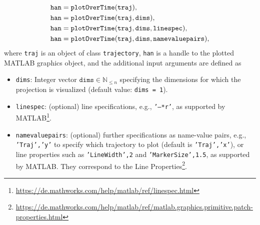 \begin{equation*}
	\begin{split}
		&\texttt{han} = {\normalfont \texttt{plotOverTime}}(\texttt{traj}), \\
		&\texttt{han} = {\normalfont \texttt{plotOverTime}}(\texttt{traj},\texttt{dims}), \\
		&\texttt{han} = {\normalfont \texttt{plotOverTime}}(\texttt{traj},\texttt{dims},\texttt{linespec}), \\
		&\texttt{han} = {\normalfont \texttt{plotOverTime}}(\texttt{traj},\texttt{dims},\texttt{namevaluepairs}),
	\end{split}
\end{equation*}
where \texttt{traj} is an object of class \texttt{trajectory}, \texttt{han} is a handle to the plotted MATLAB graphics object, and the additional input arguments are defined as

\begin{itemize}
	\item \texttt{dims}: Integer vector $\texttt{dims} \in \mathbb{N}_{\leq n}$ specifying the dimensions for which the projection is visualized (default value: \texttt{dims = 1}).
	\item \texttt{linespec}: (optional) line specifications, e.g., \texttt{'--*r'}, as supported by MATLAB\footnote{\url{https://de.mathworks.com/help/matlab/ref/linespec.html}}.
	\item \texttt{namevaluepairs}: (optional) further specifications as name-value pairs, e.g., \texttt{'Traj','y'} to specify which trajectory to plot (default is \texttt{'Traj','x'}), or line properties such as
	\texttt{'LineWidth',2} and \texttt{'MarkerSize',1.5}, as supported by MATLAB.
	They correspond to the Line Properties\footnote{\url{https://de.mathworks.com/help/matlab/ref/matlab.graphics.primitive.patch-properties.html}}.
\end{itemize}
